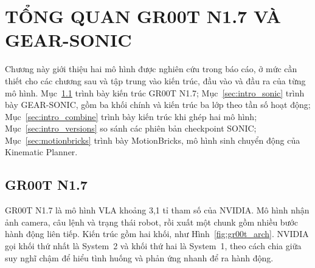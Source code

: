 \documentclass[12pt,a4paper,oneside]{report}
\begin{document}
\chapter{TỔNG QUAN GR00T N1.7 VÀ GEAR-SONIC}
\label{chap:intro_models}
\label{chap:overview}
Chương này giới thiệu hai mô hình được nghiên cứu trong báo cáo, ở mức cần thiết cho các chương sau và tập trung vào kiến trúc, đầu vào và đầu ra của từng mô hình. Mục~\ref{sec:intro_gr00t} trình bày kiến trúc GR00T N1.7; Mục~\ref{sec:intro_sonic} trình bày GEAR-SONIC, gồm ba khối chính và kiến trúc ba lớp theo tần số hoạt động; Mục~\ref{sec:intro_combine} trình bày kiến trúc khi ghép hai mô hình; Mục~\ref{sec:intro_versions} so sánh các phiên bản checkpoint SONIC; Mục~\ref{sec:motionbricks} trình bày MotionBricks, mô hình sinh chuyển động của Kinematic Planner.

\section{GR00T N1.7}
\label{sec:intro_gr00t}
\label{sec:gr00t}

GR00T N1.7 là mô hình VLA khoảng 3,1 tỉ tham số của NVIDIA. Mô hình nhận ảnh camera, câu lệnh và trạng thái robot, rồi xuất một chunk gồm nhiều bước hành động liên tiếp. Kiến trúc gồm hai khối, như Hình~\ref{fig:gr00t_arch}. NVIDIA gọi khối thứ nhất là System~2 và khối thứ hai là System~1, theo cách chia giữa suy nghĩ chậm để hiểu tình huống và phản ứng nhanh để ra hành động.
\end{document}
